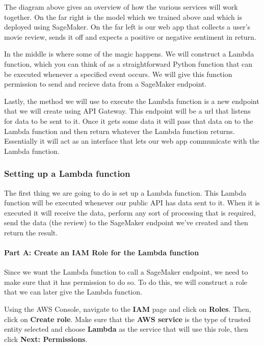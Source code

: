 \documentclass[11pt]{article}
\begin{document}
The diagram above gives an overview of how the various services will
work together. On the far right is the model which we trained above and
which is deployed using SageMaker. On the far left is our web app that
collects a user's movie review, sends it off and expects a positive or
negative sentiment in return.

In the middle is where some of the magic happens. We will construct a
Lambda function, which you can think of as a straightforward Python
function that can be executed whenever a specified event occurs. We will
give this function permission to send and recieve data from a SageMaker
endpoint.

Lastly, the method we will use to execute the Lambda function is a new
endpoint that we will create using API Gateway. This endpoint will be a
url that listens for data to be sent to it. Once it gets some data it
will pass that data on to the Lambda function and then return whatever
the Lambda function returns. Essentially it will act as an interface
that lets our web app communicate with the Lambda function.

\hypertarget{setting-up-a-lambda-function}{%
\subsubsection{Setting up a Lambda
function}\label{setting-up-a-lambda-function}}

The first thing we are going to do is set up a Lambda function. This
Lambda function will be executed whenever our public API has data sent
to it. When it is executed it will receive the data, perform any sort of
processing that is required, send the data (the review) to the SageMaker
endpoint we've created and then return the result.

\hypertarget{part-a-create-an-iam-role-for-the-lambda-function}{%
\paragraph{Part A: Create an IAM Role for the Lambda
function}\label{part-a-create-an-iam-role-for-the-lambda-function}}

Since we want the Lambda function to call a SageMaker endpoint, we need
to make sure that it has permission to do so. To do this, we will
construct a role that we can later give the Lambda function.

Using the AWS Console, navigate to the \textbf{IAM} page and click on
\textbf{Roles}. Then, click on \textbf{Create role}. Make sure that the
\textbf{AWS service} is the type of trusted entity selected and choose
\textbf{Lambda} as the service that will use this role, then click
\textbf{Next: Permissions}.
\end{document}

